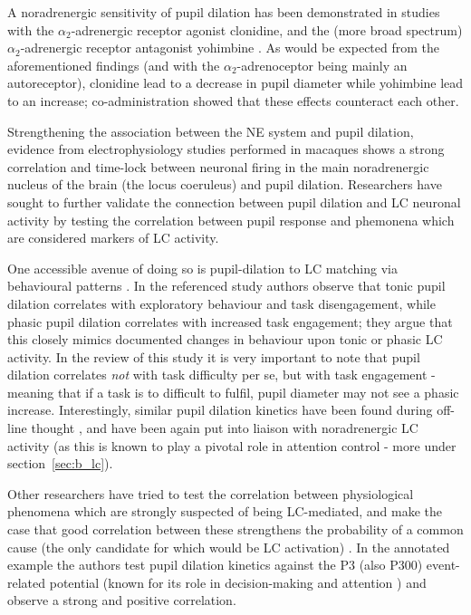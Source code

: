 	A noradrenergic sensitivity of pupil dilation has been demonstrated in studies with the $\alpha_2$-adrenergic receptor agonist clonidine, and the (more broad spectrum) $\alpha_2$-adrenergic receptor antagonist yohimbine \citep{Phillips2000}. 
	As would be expected from the aforementioned findings (and with the $\alpha_2$-adrenoceptor being mainly an autoreceptor), clonidine lead to a decrease in pupil diameter while yohimbine lead to an increase; co-administration showed that these effects counteract each other.
	
	Strengthening the association between the NE system and pupil dilation, evidence from electrophysiology studies performed in macaques \citep{Rajkowski1994} shows a strong correlation and time-lock between neuronal firing in the main noradrenergic nucleus of the brain (the locus coeruleus) and pupil dilation.
	Researchers have sought to further validate the connection between pupil dilation and LC neuronal activity by testing the correlation between pupil response and phemonena which are considered markers of LC activity.
	
	One accessible avenue of doing so is pupil-dilation to LC matching via behavioural patterns \citep{Gilzenrat2010}.
	In the referenced study authors observe that tonic pupil dilation correlates with exploratory behaviour and task disengagement, while phasic pupil dilation correlates with increased task engagement; they argue that this closely mimics documented \citep{Aston-Jones2005} changes in behaviour upon tonic or phasic LC activity.
	In the review of this study it is very important to note that pupil dilation correlates \textit{not} with task difficulty per se, but with task engagement - meaning that if a task is to difficult to fulfil, pupil diameter may not see a phasic increase.
	Interestingly, similar pupil dilation kinetics have been found during off-line thought \citep{Smallwood2011}, and have been again put into liaison with noradrenergic LC activity (as this is known to play a pivotal role in attention control - more under section~\ref{sec:b_lc}).   
	
	Other researchers have tried to test the correlation between physiological phenomena which are strongly suspected of being LC-mediated, and make the case that good correlation between these strengthens the probability of a common cause (the only candidate for which would be LC activation) \citep{Murphy2011}.
	In the annotated example the authors test pupil dilation kinetics against the P3 (also P300) event-related potential (known for its role in decision-making \citep{CHAPMAN1964} and attention \citep{Picton19992}) and observe a strong and positive correlation.
	
